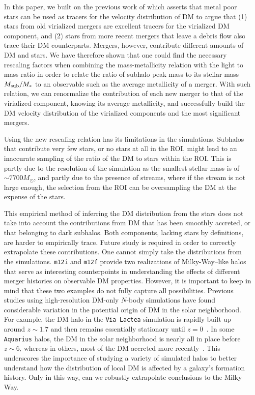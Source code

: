\documentclass[twocolumn,preprintnumbers]{aastex6}
\begin{document}
In this paper, we built on the previous work of \cite{Herzog-Arbeitman:2017fte} which asserts that metal poor stars can be used as tracers for the velocity distribution of DM to argue that (1) stars from old virialized mergers are excellent tracers for the virialized DM component, and (2) stars from more recent mergers that leave a debris flow also trace their DM counterparts. Mergers, however, contribute different amounts of DM and stars. We have therefore shown that one could find the necessary rescaling factors when combining the mass-metallicity relation with the light to mass ratio in order to relate the ratio of subhalo peak mass to its stellar mass $M_{\rm{sub}}/M_{*}$ to an observable such as the average metallicity of a merger. With such relation, we can renormalize the contribution of each new merger to that of the virialized component, knowing its average metallicity, and successfully build the DM velocity distribution of the virialized components and the most significant mergers. 

Using the new rescaling relation has its limitations in the simulations. Subhalos that contribute very few stars, or no stars at all in the ROI, might lead to an inaccurate sampling of the ratio of the DM to stars within the ROI. This is partly due to the resolution of the simulation as the smallest stellar mass is of $\sim 7700 M_{\odot}$, and partly due to the presence of streams, where if the stream is not large enough, the selection from the ROI can be oversampling the DM at the expense of the stars.

This empirical method of inferring the DM distribution from the stars does not take into account the contributions from DM that has been smoothly accreted, or that belonging to dark subhalos. Both components, lacking stars by definitions, are harder to empirically trace. Future study is required in order to correctly extrapolate these contributions. One cannot simply take the distributions from the simulations.
\texttt{m12i} and \texttt{m12f} provide two realizations of Milky-Way--like halos that serve as interesting counterpoints in understanding the effects of different merger histories on observable DM properties.  However, it is important to keep in mind that these two examples do not fully capture all  possibilities.  Previous studies using high-resolution DM-only $N$-body simulations have found considerable variation in the potential origin of DM in the solar neighborhood.  For example, the DM halo in the \texttt{Via Lactea} simulation is rapidly built up around $z\sim 1.7$ and then remains essentially stationary until $z=0$~\citep{Diemand:2007qr}.  In some \texttt{Aquarius} halos, the DM in the solar neighborhood is nearly all in place before $z\sim6$, whereas in others, most of the DM accreted more recently~\citep{2011MNRAS.413.1373W}.  This underscores the importance of studying a variety of simulated halos to better understand how the distribution of local DM is affected by a galaxy's formation history.  Only in this way, can we robustly  extrapolate conclusions to the Milky Way.  
\end{document}
